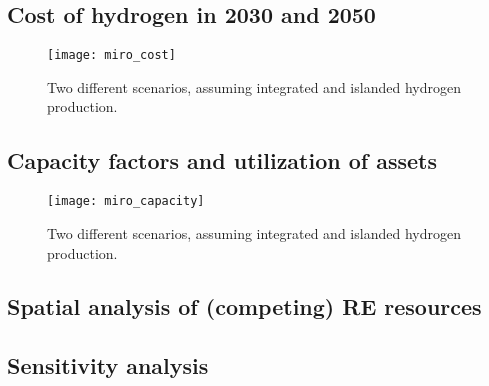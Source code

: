 \subsection{Cost of hydrogen in 2030 and 2050}

\begin{figure}[h!]
    \centering
    \texttt{[image: miro\_cost]}
    \caption{Two different scenarios, assuming integrated and islanded hydrogen production.}
    \label{fig:results_costs}
\end{figure}


\subsection{Capacity factors and utilization of assets}

\begin{figure}[h!]
    \centering
    \texttt{[image: miro\_capacity]}
    \caption{Two different scenarios, assuming integrated and islanded hydrogen production.}
    \label{fig:results_capacity}
\end{figure}

\subsection{Spatial analysis of (competing) RE resources}
\subsection{Sensitivity analysis}
